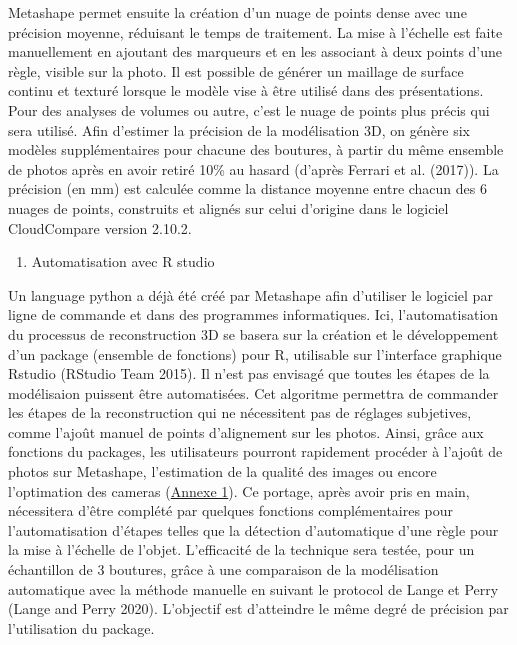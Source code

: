 \documentclass[]{article}
\providecommand{\tightlist}{%
  \setlength{\itemsep}{0pt}\setlength{\parskip}{0pt}}
\begin{document}
Metashape permet ensuite la création d'un nuage de points dense avec une
précision moyenne, réduisant le temps de traitement. La mise à l'échelle
est faite manuellement en ajoutant des marqueurs et en les associant à
deux points d'une règle, visible sur la photo. Il est possible de
générer un maillage de surface continu et texturé lorsque le modèle vise
à être utilisé dans des présentations. Pour des analyses de volumes ou
autre, c'est le nuage de points plus précis qui sera utilisé. Afin
d'estimer la précision de la modélisation 3D, on génère six modèles
supplémentaires pour chacune des boutures, à partir du même ensemble de
photos après en avoir retiré 10\% au hasard (d'après Ferrari et al.
(2017)). La précision (en mm) est calculée comme la distance moyenne
entre chacun des 6 nuages de points, construits et alignés sur celui
d'origine dans le logiciel CloudCompare version 2.10.2.

\begin{enumerate}
\def\labelenumi{\arabic{enumi})}
\setcounter{enumi}{2}
\tightlist
\item
  Automatisation avec R studio
\end{enumerate}

Un language python a déjà été créé par Metashape afin d'utiliser le
logiciel par ligne de commande et dans des programmes informatiques.
Ici, l'automatisation du processus de reconstruction 3D se basera sur la
création et le développement d'un package (ensemble de fonctions) pour
R, utilisable sur l'interface graphique Rstudio (RStudio Team 2015). Il
n'est pas envisagé que toutes les étapes de la modélisaion puissent être
automatisées. Cet algoritme permettra de commander les étapes de la
reconstruction qui ne nécessitent pas de réglages subjetives, comme
l'ajoût manuel de points d'alignement sur les photos. Ainsi, grâce aux
fonctions du packages, les utilisateurs pourront rapidement procéder à
l'ajoût de photos sur Metashape, l'estimation de la qualité des images
ou encore l'optimation des cameras
(\protect\hyperlink{Annexeux5cux25201}{Annexe 1}). Ce portage, après
avoir pris en main, nécessitera d'être complété par quelques fonctions
complémentaires pour l'automatisation d'étapes telles que la détection
d'automatique d'une règle pour la mise à l'échelle de l'objet.
L'efficacité de la technique sera testée, pour un échantillon de 3
boutures, grâce à une comparaison de la modélisation automatique avec la
méthode manuelle en suivant le protocol de Lange et Perry (Lange and
Perry 2020). L'objectif est d'atteindre le même degré de précision par
l'utilisation du package.
\end{document}
